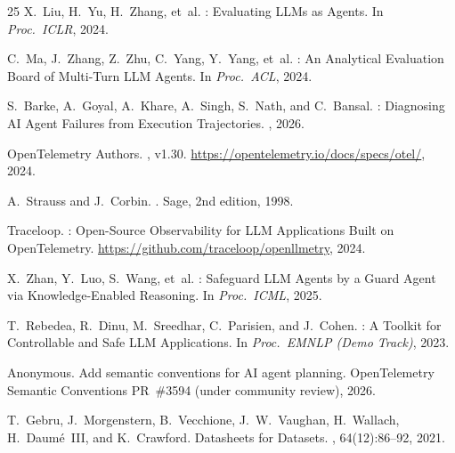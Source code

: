 \documentclass{article}
\begin{document}
\begin{thebibliography}{25}
X.~Liu, H.~Yu, H.~Zhang, et~al.
: Evaluating {LLMs} as Agents.
\newblock In {\em Proc.\ ICLR}, 2024.

C.~Ma, J.~Zhang, Z.~Zhu, C.~Yang, Y.~Yang, et~al.
: An Analytical Evaluation Board of Multi-Turn {LLM}
  Agents.
\newblock In {\em Proc.\ ACL}, 2024.

S.~Barke, A.~Goyal, A.~Khare, A.~Singh, S.~Nath, and C.~Bansal.
: Diagnosing AI Agent Failures from Execution Trajectories.
, 2026.

{OpenTelemetry Authors}.
, v1.30.
\newblock \url{https://opentelemetry.io/docs/specs/otel/}, 2024.

A.~Strauss and J.~Corbin.
.
\newblock Sage, 2nd edition, 1998.

{Traceloop}.
: Open-Source Observability for {LLM} Applications
  Built on {OpenTelemetry}.
\newblock \url{https://github.com/traceloop/openllmetry}, 2024.

X.~Zhan, Y.~Luo, S.~Wang, et~al.
: Safeguard {LLM} Agents by a Guard Agent via
  Knowledge-Enabled Reasoning.
\newblock In {\em Proc.\ ICML}, 2025.

T.~Rebedea, R.~Dinu, M.~Sreedhar, C.~Parisien, and J.~Cohen.
: A Toolkit for Controllable and Safe {LLM}
  Applications.
\newblock In {\em Proc.\ EMNLP (Demo Track)}, 2023.

Anonymous.
\newblock Add semantic conventions for AI agent planning.
\newblock OpenTelemetry Semantic Conventions PR~\#3594 (under community review),
  2026.

T.~Gebru, J.~Morgenstern, B.~Vecchione, J.~W.~Vaughan, H.~Wallach,
  H.~Daum{\'e}~III, and K.~Crawford.
\newblock Datasheets for Datasets.
, 64(12):86--92, 2021.

\end{thebibliography}
\end{document}
